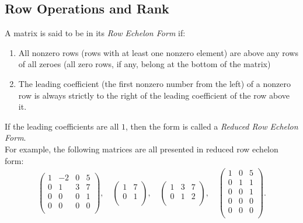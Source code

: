 	\subsection{Row Operations and Rank}
	A matrix is said to be in its \textit{Row Echelon Form} if:
	\begin{enumerate}
		\item All nonzero rows (rows with at least one nonzero element) are above any rows of all zeroes (all zero rows, if any, belong at the bottom of the matrix)
		\item The leading coefficient (the first nonzero number from the left) of a nonzero row is always strictly to the right of the leading coefficient of the row above it.
	\end{enumerate}

	If the leading coefficients are all $1$, then the form is called a \textit{Reduced Row Echelon Form}.\\
	For example, the following matrices are all presented in reduced row echelon form:
	\begin{align*}
		\begin{pmatrix}
			1 & -2 & 0 & 5\\
			0 & 1  & 3 & 7\\
			0 & 0  & 0 & 1\\
			0 & 0  & 0 & 0\\
		\end{pmatrix},\quad
		\begin{pmatrix}
			1 & 7\\
			0 & 1\\
		\end{pmatrix},\quad
		\begin{pmatrix}
			1 & 3 & 7\\
			0 & 1 & 2\\
		\end{pmatrix},\quad
		\begin{pmatrix}
			1 & 0 & 5\\
			0 & 1 & 1\\
			0 & 0 & 1\\
			0 & 0 & 0\\
			0 & 0 & 0\\
		\end{pmatrix}.
	\end{align*}

